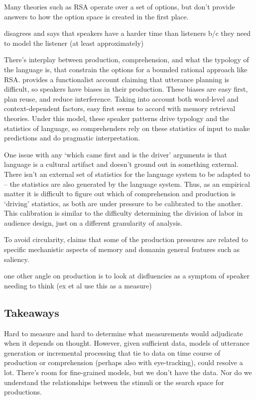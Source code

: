 \documentclass[]{article}
\begin{document}
Many theories such as RSA operate over a set of options, but don't provide answers to how the option space is created in the first place. 

\cite{heller2012} disagrees and says that speakers have a harder time than listeners b/c they need to model the listener (at least approximately) %

There's interplay between production, comprehension, and what the typology of the language is, that constrain the options for a bounded rational approach like RSA. \cite{macdonald2013} provides a functionalist account claiming that utterance planning is difficult, so speakers have biases in their production. These biases are easy first, plan reuse, and reduce interference. Taking into account both word-level and context-dependent factors, easy first seems to accord with memory retrieval theories. %
Under this model, these speaker patterns drive typology and the statistics of language, so comprehenders rely on these statistics of input to make predictions and do pragmatic interpretation. 



One issue with any `which came first and is the driver' arguments is that language is a cultural artifact and doesn't ground out in something external. There isn't an external set of statistics for the language system to be adapted to -- the statistics are also generated by the language system. Thus, as an empirical matter it is difficult to figure out which of comprehension and production is `driving' statistics, as both are under pressure to be calibrated to the another. This calibration is similar to the difficulty determining the division of labor in audience design, just on a different granularity of analysis. 

To avoid circularity, \cite{macdonald2013} claims that some of the production pressures are related to specific mechanistic aspects of memory and domanin general features such as saliency. %

one other angle on production is to look at disfluencies as a symptom of speaker needing to think (ex \cite{yoon2014} et al use this as a measure)

\subsection{Takeaways}
Hard to measure and hard to determine what measurements would adjudicate when it depends on thought. However, given sufficient data, models of utterance generation or incremental processing that tie to data on time course of production or comprehension (perhaps also with eye-tracking), could resolve a lot. There's room for fine-grained models, but we don't have the data. Nor do we understand the relationships between the stimuli or the search space for productions. 
\end{document}
